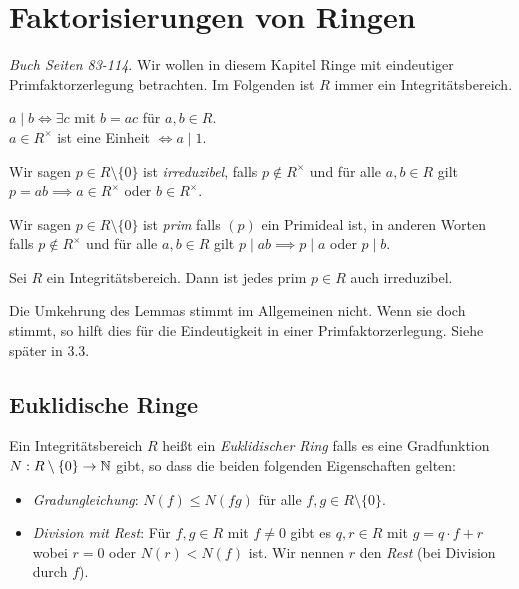 \graphicspath{{Images/}}

\chapter{Faktorisierungen von Ringen}
\emph{Buch Seiten 83-114}.
Wir wollen in diesem Kapitel Ringe mit eindeutiger Primfaktorzerlegung betrachten.
Im Folgenden ist $R$ immer ein Integritätsbereich.

\begin{definition}[Wiederholung]
	$a \mid b \Leftrightarrow \exists  c $ mit $b=ac$ für $a,b \in R$.\\
	$a \in R^{\times}$ ist eine Einheit $\Leftrightarrow a \mid 1$.
\end{definition}

\begin{definition}
	Wir sagen $p \in R \setminus \{0\}$ ist \emph{irreduzibel}, falls $p \not\in R^{\times}$ und für alle $a,b \in R$ gilt
	$p = ab \implies a \in R^{\times}$ oder $b \in R^{\times}$.
\end{definition}

\begin{definition}
	Wir sagen $p \in R \setminus \{0\}$ ist \emph{prim} falls $(p)$ ein Primideal ist, in anderen Worten
	falls $p \not\in R^{\times}$ und für alle $a,b \in R$ gilt $p \mid ab \implies p \mid a$ oder $p \mid b$.
\end{definition}

\begin{lemma}
	Sei $R$ ein Integritätsbereich. Dann ist jedes prim $p \in R$ auch irreduzibel.
\end{lemma}


\begin{remark}
	Die Umkehrung des Lemmas stimmt im Allgemeinen nicht.
	Wenn sie doch stimmt, so hilft dies für die Eindeutigkeit in einer Primfaktorzerlegung.
	Siehe später in 3.3.
\end{remark}

\section{Euklidische Ringe}
\begin{definition}
	Ein Integritätsbereich $R$ heißt ein \emph{Euklidischer Ring} falls es eine Gradfunktion $N: R \setminus \{0\}  \to \mathbb{N}$ gibt,
	so dass die beiden folgenden Eigenschaften gelten:
	\begin{itemize}
		\item \emph{Gradungleichung}: $N(f) \leq N(fg)$ für alle $f,g \in R \setminus \{0\} $.
		\item \emph{Division mit Rest}: Für $f,g \in R$ mit $f \neq  0$ gibt es $q,r \in R$ mit $g = q\cdot f + r$ wobei $r = 0$ oder $N(r) < N(f)$ ist.
			Wir nennen $r$ den \emph{Rest} (bei Division durch $f $).
	\end{itemize}
\end{definition}






